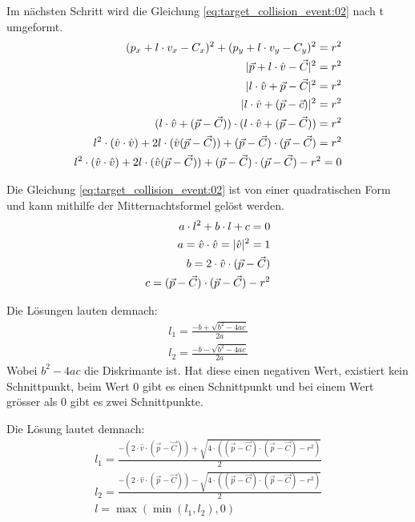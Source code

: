 Im nächsten Schritt wird die Gleichung \ref{eq:target_collision_event:02} nach t umgeformt.
\begin{align}
    (p_x + l \cdot v_x - C_x)^2 + (p_y + l \cdot v_y - C_y)^2 = r^2\\
    \lvert \vec{p} + l \cdot \hat{v} - \vec{C} \rvert^2 = r^2\\
    \lvert l \cdot \hat{v} + \vec{p} - \vec{C} \rvert^2 = r^2\\
    \lvert l \cdot \hat{v} + (\vec{p} - \vec{c}) \rvert^2 = r^2\\
    (l \cdot \hat{v} + (\vec{p} - \vec{C})) \cdot (l \cdot \hat{v} + (\vec{p} - \vec{C})) = r^2\\
    l^2 \cdot (\hat{v} \cdot \hat{v}) + 2l \cdot (\hat{v}(\vec{p} - \vec{C})) + (\vec{p} - \vec{C}) \cdot (\vec{p} - \vec{C}) = r^2\\
    l^2 \cdot (\hat{v} \cdot \hat{v}) + 2l \cdot (\hat{v}(\vec{p} - \vec{C})) + (\vec{p} - \vec{C}) \cdot (\vec{p} - \vec{C}) - r^2 = 0\label{eq:target_collision_event:03}
\end{align}

Die Gleichung \ref{eq:target_collision_event:02} ist von einer quadratischen Form und kann mithilfe der Mitternachtsformel
gelöst werden.
\begin{align}
    a \cdot l^2 + b \cdot l + c = 0\\
    a = \hat{v} \cdot \hat{v} = \lvert \hat{v} \rvert^2 = 1\\
    b = 2 \cdot \hat{v} \cdot (\vec{p} - \vec{C})\\
    c = (\vec{p} - \vec{C}) \cdot (\vec{p} - \vec{C}) - r^2
\end{align}

Die Lösungen lauten demnach:
\begin{align}
    l_1 = \frac{-b + \sqrt{b^2 - 4ac}}{2a}\\
    l_2 = \frac{-b - \sqrt{b^2 - 4ac}}{2a}
\end{align}
Wobei $b^2 - 4ac$ die Diskrimante ist. Hat diese einen negativen Wert, existiert kein Schnittpunkt,
beim Wert $0$ gibt es einen Schnittpunkt und bei einem Wert grösser als $0$ gibt es zwei Schnittpunkte.

Die Lösung lautet demnach:
\begin{align}
    l_1 = \frac{-(2 \cdot \hat{v} \cdot (\vec{p} - \vec{C})) + \sqrt{4 \cdot ((\vec{p} - \vec{C}) \cdot (\vec{p} - \vec{C}) - r^2)}}{2}\\
    l_2 = \frac{-(2 \cdot \hat{v} \cdot (\vec{p} - \vec{C})) - \sqrt{4 \cdot ((\vec{p} - \vec{C}) \cdot (\vec{p} - \vec{C}) - r^2)}}{2}\\
    l = \max{(\min{(l_1, l_2)}, 0)}
\end{align}

